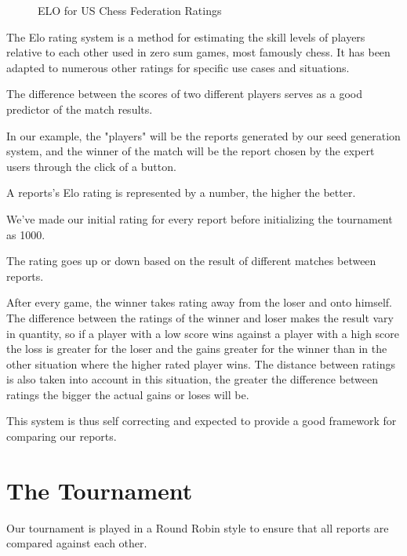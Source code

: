 \begin{figure}[!htb]
    \caption{\label{fig:my-label2} ELO for US Chess Federation Ratings  \cite{ELOUSCF}}
\end{figure}

The Elo rating system is a method for estimating the skill levels of players relative to each other used in zero sum games, most famously chess. It has been adapted to numerous other ratings for specific use cases and situations.\cite{ELOFORMULA}

The difference between the scores of two different players serves as a good predictor of the match results.

In our example, the "players" will be the reports generated by our seed generation system, and the winner of the match will be the report chosen by the expert users through the click of a button.

A reports's Elo rating is represented by a number, the higher the better.

We've made our initial rating for every report before initializing the tournament as 1000.

The rating goes up or down based on the result of different matches between reports. 

After every game, the winner takes rating away from the loser and onto himself.
The difference between the ratings of the winner and loser makes the result vary in quantity, so if a player with a low score wins against a player with a high score the loss is greater for the loser and the gains greater for the winner than in the other situation where the higher rated player wins.
The distance between ratings is also taken into account in this situation, the greater the difference between ratings the bigger the actual gains or loses will be.

This system is thus self correcting and expected to provide a good framework for comparing our reports.

\section{The Tournament}
\label{cap4:sec:tourney}

Our tournament is played in a Round Robin style to ensure that all reports are compared against each other.

